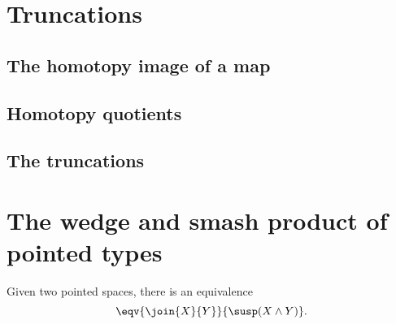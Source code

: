 \documentclass[11pt]{memoir} %
\begin{document}








\chapter{Truncations}
\section{The homotopy image of a map}
\section{Homotopy quotients}
\section{The truncations}







\chapter{The wedge and smash product of pointed types}

\begin{thm}
Given two pointed spaces, there is an equivalence
\begin{equation*}
\eqv{\join{X}{Y}}{\susp(X\wedge Y)}.
\end{equation*}
\end{thm}
\end{document}
